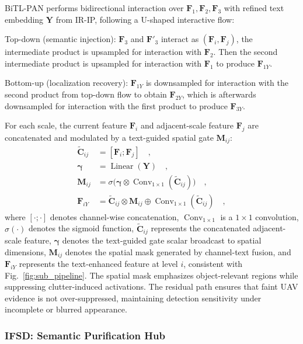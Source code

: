 \documentclass[letterpaper, 10 pt, conference]{ieeeconf}  %
\newcommand{\mathopfont}[1]{\mathop{\mathrm{#1}}\nolimits}
\begin{document}
BiTL-PAN performs bidirectional interaction over $\mathbf{F}_1,\mathbf{F}_2,\mathbf{F}_3$ with refined text embedding $\mathbf{Y}$ from IR-IP, following a U-shaped interactive flow:

Top-down (semantic injection): $\mathbf{F}_3$ and $\mathbf{F}'_3$ interact as $(\mathbf{F}_i,\mathbf{F}_j)$, the intermediate product is upsampled for interaction with $\mathbf{F}_2$. Then the second intermediate product is upsampled for interaction with $\mathbf{F}_1$ to produce $\mathbf{F}_{1Y}$.

Bottom-up (localization recovery): $\mathbf{F}_{1Y}$ is downsampled for interaction with the second product from top-down flow to obtain $\mathbf{F}_{2Y}$, which is afterwards downsampled for interaction with the first product to produce $\mathbf{F}_{3Y}$.

For each scale, the current feature $\mathbf{F}_i$ and adjacent-scale feature $\mathbf{F}_j$ are concatenated and modulated by a text-guided spatial gate $\mathbf{M}_{ij}$:
\begin{align}
\tilde{\mathbf{C}}_{ij} &= [\mathbf{F}_i; \mathbf{F}_j] \quad, \\
\boldsymbol{\gamma} &=\mathopfont{Linear}(\mathbf{Y}) \quad, \\
\mathbf{M}_{ij} &= \sigma\big( \boldsymbol{\gamma} \otimes \mathopfont{Conv}_{1\times1}(\tilde{\mathbf{C}}_{ij}) \big) \quad, \\
\mathbf{F}_{iY} &= \tilde{\mathbf{C}}_{ij} \otimes \mathbf{M}_{ij} \oplus \mathopfont{Conv}_{1\times1}(\tilde{\mathbf{C}}_{ij}) \quad,
\end{align}
where $[\cdot ; \cdot]$ denotes channel-wise concatenation, $\mathopfont{Conv}_{1\times1}$ is a $1\times1$ convolution, $\sigma(\cdot)$ denotes the sigmoid function, $\tilde{\mathbf{C}}_{ij}$ represents the concatenated adjacent-scale feature, $\boldsymbol{\gamma}$ denotes the text-guided gate scalar broadcast to spatial dimensions, $\mathbf{M}_{ij}$ denotes the spatial mask generated by channel-text fusion, and $\mathbf{F}_{iY}$ represents the text-enhanced feature at level $i$, consistent with Fig.~\ref{fig:sub_pipeline}. The spatial mask emphasizes object-relevant regions while suppressing clutter-induced activations. The residual path ensures that faint UAV evidence is not over-suppressed, maintaining detection sensitivity under incomplete or blurred appearance.

\subsubsection{IFSD: Semantic Purification Hub}
\label{subsec:ifsd}
\end{document}

